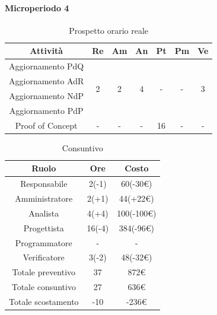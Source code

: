 \paragraph{Microperiodo 4}
\begin{table}[H]
	\centering
	\begin{tabular}{|c|c|c|c|c|c|c|}
		\hline
		\rowcolor{lighter-grayer}
		\textbf{Attività} & \textbf{Re}        & \textbf{Am}        & \textbf{An}        & \textbf{Pt}        & \textbf{Pm}        & \textbf{Ve}        \\ \hline
		Aggiornamento PdQ & \multirow{4}{*}{2} & \multirow{4}{*}{2} & \multirow{4}{*}{4} & \multirow{4}{*}{-} & \multirow{4}{*}{-} & \multirow{4}{*}{3} \\ \cline{1-1}
		Aggiornamento AdR &                    &                    &                    &                    &                    &                    \\ \cline{1-1}
		Aggiornamento NdP &                    &                    &                    &                    &                    &                    \\ \cline{1-1}
		Aggiornamento PdP &                    &                    &                    &                    &                    &                    \\ \hline
		Proof of Concept               & -                  & -                  & -                  & 16                 & -                  & -                  \\ \hline
	\end{tabular}
\caption{ Prospetto orario reale\\}
\end{table}

\begin{table}[H]
	\centering
	\renewcommand{\arraystretch}{1.5}
	\begin{tabular}{|c|c|c|}
		\hline
		\rowcolor{lighter-grayer}
		Ruolo & Ore & Costo \\ \hline
		Responsabile & 2(-1) & 60(-30\euro) \\ \hline
		Amministratore & 2(+1) & 44(+22\euro) \\ \hline
		Analista & 4(+4) & 100(-100\euro) \\ \hline
		Progettista & 16(-4) & 384(-96\euro) \\ \hline
		Programmatore & - & - \\ \hline
		Verificatore & 3(-2) & 48(-32\euro) \\ \hline
		Totale preventivo & 37 & 872\euro \\ \hline
		Totale consuntivo & 27 & 636\euro \\ \hline
		Totale scostamento & -10 & -236\euro \\ \hline
	\end{tabular}
	\caption{ Consuntivo\\}
\end{table}


